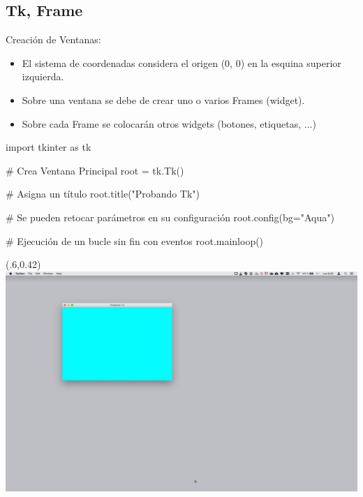 \documentclass[10pt, envcountsect , spanish]{beamer}
\begin{document}
\subsection{Tk, Frame}

\begin{frame}[fragile]{Creación de Ventanas: }

\begin{itemize}
\item El sistema de coordenadas considera el origen (0, 0) en la esquina superior izquierda.
\item Sobre una ventana se debe de crear uno o varios Frames (widget).
\item Sobre cada Frame se colocarán otros widgets (botones, etiquetas, ...)
\end{itemize}

\footnotesize
\begin{pyverbatim}[][frame=single]
import tkinter as tk

# Crea Ventana Principal
root = tk.Tk()

# Asigna un título
root.title("Probando Tk")

# Se pueden retocar parámetros en su configuración
root.config(bg="Aqua")

# Ejecución de un bucle sin fin con eventos
root.mainloop()
\end{pyverbatim}

\begin{textblock*}{.4\textwidth}(.6\textwidth,0.42\textheight)
\includegraphics[width=\textwidth]{fig/tk}
\end{textblock*}


\end{frame}
\end{document}
